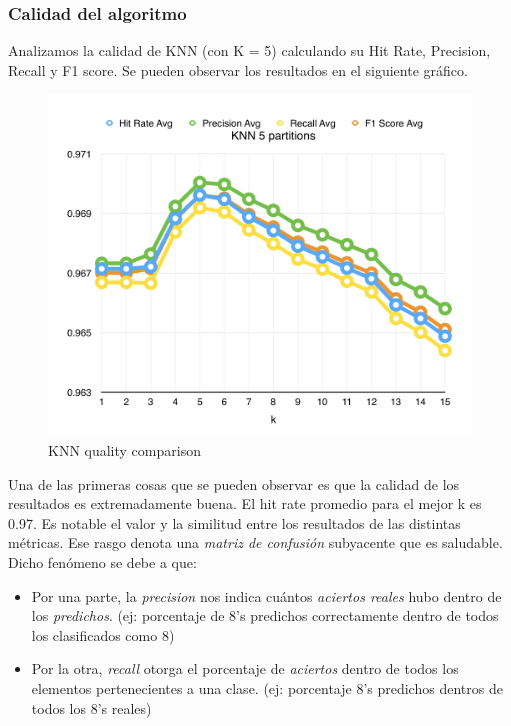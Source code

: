 \subsubsection{Calidad del algoritmo}

Analizamos la calidad de KNN (con K = 5) calculando su Hit Rate, Precision, Recall y F1 score. Se pueden observar los resultados en el siguiente gráfico.

\newpage

\begin{figure}[h!]
  \begin{center}
	\includegraphics[scale=0.7]{exp1/KNN-5p-Scores.png}
	\caption{KNN quality comparison}
  \end{center}
\end{figure}

Una de las primeras cosas que se pueden observar es que la calidad de los resultados es extremadamente buena. El hit rate promedio para el mejor k es 0.97. Es notable el valor y la similitud entre los resultados de las distintas m\'etricas. Ese rasgo denota una \textit{matriz de confusi\'on} subyacente que es saludable. Dicho fen\'omeno se debe a que: 

\begin{itemize}
\item Por una parte, la \textit{precision} nos indica cu\'antos \textit{aciertos reales} hubo dentro de los \textit{predichos}. (ej: porcentaje de 8's predichos correctamente dentro de todos los clasificados como 8)
\item Por la otra, \textit{recall} otorga el porcentaje de \textit{aciertos} dentro de todos los elementos pertenecientes a una clase. (ej: porcentaje 8's predichos dentros de todos los 8's reales)
\end{itemize}

